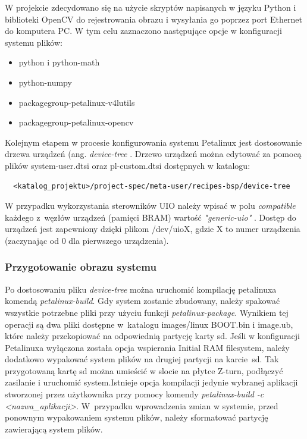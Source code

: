 W projekcie zdecydowano się na użycie skryptów napisanych w języku Python i biblioteki OpenCV do rejestrowania obrazu i 
wysyłania go poprzez port Ethernet do komputera PC. W tym celu zaznaczono następujące opcje w konfiguracji systemu 
plików:  

\begin{itemize}
  \item python i python-math
  \item python-numpy
  \item packagegroup-petalinux-v4lutils 
  \item packagegroup-petalinux-opencv
\end{itemize}


Kolejnym etapem w procesie konfigurowania systemu Petalinux jest dostosowanie drzewa urządzeń (ang. \emph{device-tree}
. Drzewo urządzeń można edytować za pomocą plików system-user.dtsi oraz pl-custom.dtsi dostępnych w katalogu:

\begin{verbatim}
  <katalog_projektu>/project-spec/meta-user/recipes-bsp/device-tree
\end{verbatim}
W przypadku wykorzystania sterowników UIO należy wpisać w polu \emph{compatible} każdego z~węzłów urządzeń (pamięci 
BRAM) wartość \emph{"generic-uio"} \cite{uio-device-tree}. Dostęp do urządzeń jest zapewniony dzięki plikom /dev/uioX, 
gdzie X to numer urządzenia (zaczynając od 0 dla pierwszego urządzenia).

\subsubsection{Przygotowanie obrazu systemu}

Po dostosowaniu pliku \emph{device-tree} można uruchomić kompilację petalinuxa komendą \emph{petalinux-build}.
Gdy system zostanie zbudowany, należy spakować wszystkie potrzebne pliki przy użyciu funkcji \emph{petalinux-package}.
Wynikiem tej operacji są dwa pliki dostępne w~katalogu images/linux BOOT.bin i image.ub, które należy przekopiować na
odpowiednią partycję karty sd. Jeśli w konfiguracji Petalinuxa wyłączona została opcja wspierania Initial RAM
filesystem, należy dodatkowo wypakować system plików na drugiej partycji na karcie~sd. Tak przygotowaną kartę sd można
umieścić w slocie na płytce Z-turn, podłączyć zasilanie i uruchomić system.Istnieje opcja kompilacji jedynie wybranej 
aplikacji stworzonej przez użytkownika przy pomocy komendy \emph{petalinux-build -c <nazwa\_aplikacji>}. W~przypadku 
wprowadzenia zmian w systemie, przed ponownym wypakowaniem systemu plików, należy sformatować partycję zawierającą 
system plików. 


